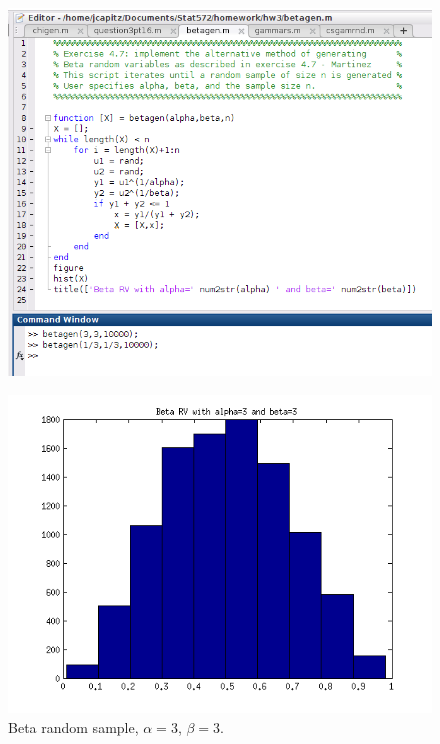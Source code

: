 \documentclass[12pt,a4paper]{article}
\begin{document}
\begin{figure}[ht!]
\begin{center}
\includegraphics[scale=.60]{q4pt7_code.png}
\caption{}
\label{q4pt7fig1}
\end{center}
\end{figure}
\FloatBarrier

\begin{figure}[ht!]
\begin{center}
\includegraphics[scale=.80]{q4pt7_hist1.png}
\caption{Beta random sample, $\alpha=3$, $\beta=3$.}
\label{q4pt7fig2}
\end{center}
\end{figure}
\FloatBarrier
\end{document}
